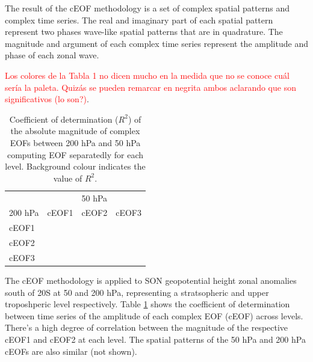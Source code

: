 \documentclass[smallextended]{svjour3}       %
\begin{document}
The result of the cEOF methodology is a set of complex spatial patterns and complex time series.
The real and imaginary part of each spatial pattern represent two phases wave-like spatial patterns that are in quadrature.
The magnitude and argument of each complex time series represent the amplitude and phase of each zonal wave.



\textcolor{red}{Los colores de la Tabla 1 no dicen mucho en la medida que no se conoce cuál sería la paleta. Quizás se pueden remarcar en negrita ambos aclarando que son significativos (lo son?)}.

\begin{table}

\caption{\label{tab:corr-ceof-splitted}Coefficient of determination (\(R^2\)) of the absolute magnitude of complex EOFs between 200 hPa and 50 hPa computing EOF separatedly for each level. Background colour indicates the value of \(R^2\).}
\centering
\begin{tabular}[t]{l>{}r>{}r>{}r}
\toprule
\multicolumn{1}{c}{} & \multicolumn{3}{c}{50 hPa} \\
\cmidrule(l{3pt}r{3pt}){2-4}
200 hPa & cEOF1 & cEOF2 & cEOF3\\
\midrule
cEOF1 & \cellcolor[HTML]{E1C0BB}{\textcolor{black}{0.28}} & \cellcolor[HTML]{FDFCFC}{\textcolor{black}{0.01}} & \cellcolor[HTML]{FDFAFA}{\textcolor{black}{0.02}}\\
cEOF2 & \cellcolor[HTML]{FFFFFF}{\textcolor{black}{0.00}} & \cellcolor[HTML]{BB7A73}{\textcolor{white}{0.60}} & \cellcolor[HTML]{FDFAFA}{\textcolor{black}{0.02}}\\
cEOF3 & \cellcolor[HTML]{FFFFFF}{\textcolor{black}{0.00}} & \cellcolor[HTML]{FFFFFF}{\textcolor{black}{0.00}} & \cellcolor[HTML]{FDFAFA}{\textcolor{black}{0.02}}\\
\bottomrule
\end{tabular}
\end{table}

The cEOF methodology is applied to SON geopotential height zonal anomalies south of 20\degree S at 50 and 200 hPa, representing a stratsopheric and upper troposhperic level respectively.
Table \ref{tab:corr-ceof-splitted} shows the coefficient of determination between time series of the amplitude of each complex EOF (cEOF) across levels.
There's a high degree of correlation between the magnitude of the respective cEOF1 and cEOF2 at each level.
The spatial patterns of the 50 hPa and 200 hPa cEOFs are also similar (not shown).
\end{document}
